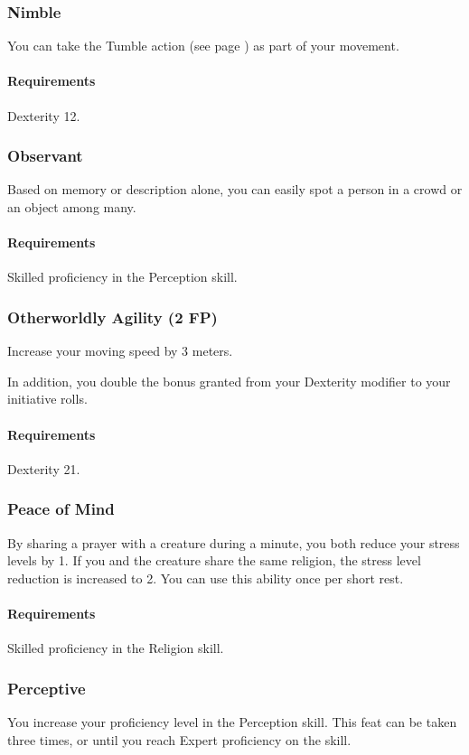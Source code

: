 \subsubsection{Nimble} \label{feat::nimble}
    You can take the Tumble action (see page \pageref{act::tumble}) as part of your movement.
    \paragraph{Requirements} Dexterity 12.
\subsubsection{Observant} \label{feat::observant}
    Based on memory or description alone, you can easily spot a person in a crowd or an object among many.
    \paragraph{Requirements} Skilled proficiency in the Perception skill.
\subsubsection{Otherworldly Agility (2 FP)} \label{feat::otherwordlyagility}
    Increase your moving speed by 3 meters.

    In addition, you double the bonus granted from your Dexterity modifier to your initiative rolls.
    \paragraph{Requirements} Dexterity 21.
\subsubsection{Peace of Mind} \label{feat::peaceofmind}
    By sharing a prayer with a creature during a minute, you both reduce your stress levels by 1.
    If you and the creature share the same religion, the stress level reduction is increased to 2.
    You can use this ability once per short rest.
    \paragraph{Requirements} Skilled proficiency in the Religion skill.
\subsubsection{Perceptive} \label{feat::perceptive}
    You increase your proficiency level in the Perception skill.
    This feat can be taken three times, or until you reach Expert proficiency on the skill.
